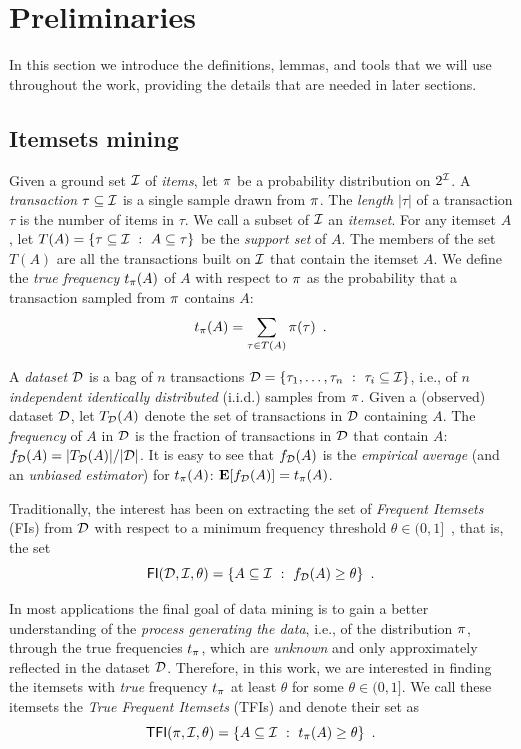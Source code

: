 \section{Preliminaries}\label{sec:prelims}
In this section we introduce the definitions, lemmas, and tools that we will use
throughout the work, providing the details that are needed in later sections.

\subsection{Itemsets mining}\label{sec:itemdef}
Given a ground set ${\cal I}$ of \emph{items}, let $\pi$ be a probability
distribution on $2^{{\cal I}}$. A \emph{transaction} $\tau\subseteq{\cal I}$ is a single
sample drawn from $\pi$. The \emph{length} $|\tau|$ of a transaction $\tau$ is
the number of items in $\tau$.   We
call a subset of ${\cal I}$ an \emph{itemset}. For any itemset $A$, let
$T(A)=\{\tau\subseteq{\cal I} ~:~ A\subseteq \tau\}$ be the \emph{support set} of
$A$. The members of the set $T(A)$ are all the transactions built on ${\cal I}$
that contain the itemset $A$. We define the \emph{true frequency} $t_\pi(A)$ of
$A$ with respect to $\pi$ as the probability that a transaction sampled from
$\pi$ contains $A$:
\[
t_\pi(A) = \sum_{\tau\in T(A)}\pi(\tau)\enspace.
\]

A \emph{dataset} ${\cal D}$ is a bag of $n$
transactions ${\cal D}=\{\tau_1,\dots,\tau_n ~:~ \tau_i\subseteq{\cal I}\}$, i.e., of $n$
\emph{independent identically distributed} (i.i.d.) samples from $\pi$.
Given a (observed) dataset ${\cal D}$, let $T_{\cal D}(A)$ denote the set of
transactions in ${\cal D}$ containing $A$. The \emph{frequency} of $A$ in ${\cal D}$ is
the fraction of transactions in ${\cal D}$ that contain $A$: $f_{\cal D}(A)=
|T_{\cal D}(A)|/|{\cal D}|$. It is easy to see that $f_{\cal D}(A)$ is the \emph{empirical
average} (and an \emph{unbiased estimator}) for $t_\pi(A)$: ${\mathbf
E}[f_{\cal D}(A)]=t_\pi(A)$.

Traditionally, the interest has been on extracting the set of \emph{Frequent
Itemsets} (FIs) from ${\cal D}$ with respect to a minimum frequency threshold
$\theta\in(0,1]$~\citep{AgrawalIS93}, that is, the set
\[
\mathsf{FI}({\cal D},{\cal I},\theta)=\{A\subseteq{\cal I} ~:~ f_{\cal D}(A)\ge\theta\}\enspace.\]

In most applications the final goal of data mining is to gain a better
understanding of the \emph{process generating the data}, i.e., of the
distribution $\pi$, through the true frequencies $t_\pi$, which are
\emph{unknown} and only approximately reflected in the dataset ${\cal D}$. Therefore,
in this work, we are interested in finding the itemsets with \emph{true}
frequency $t_\pi$ at least $\theta$ for some $\theta\in(0,1]$. We call these
itemsets the \emph{True Frequent Itemsets} (TFIs) and denote their set as
\[
\mathsf{TFI}(\pi,{\cal I},\theta)=\{A\subseteq{\cal I} ~:~ t_\pi(A)\ge\theta\}\enspace.\]

